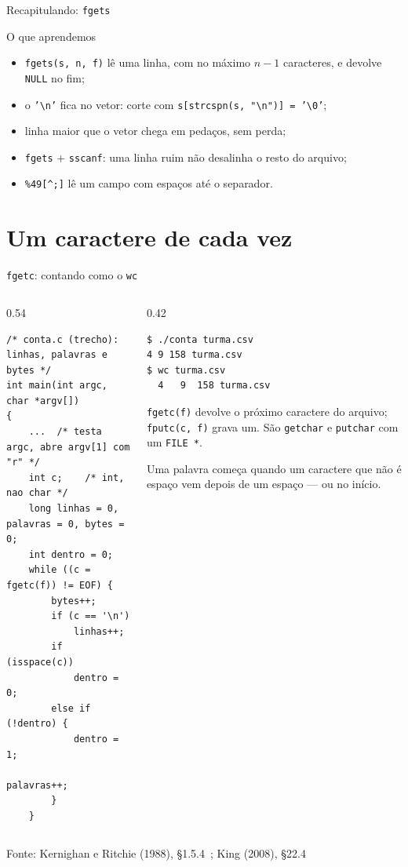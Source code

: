 \documentclass[aspectratio=169]{beamer}
\newcommand{\cir}{\textasciicircum}
\newcommand{\fonte}[1]{\vfill\hfill{\scriptsize\textcolor{UFSGray}{Fonte: #1}}}
\begin{document}
\begin{frame}{Recapitulando: \texttt{fgets}}
  \begin{block}{O que aprendemos}
    \begin{itemize}
      \item \texttt{fgets(s, n, f)} lê uma linha, com no máximo $n-1$
        caracteres, e devolve \texttt{NULL} no fim;
      \item o \texttt{'\textbackslash n'} fica no vetor: corte com
        \texttt{s[strcspn(s, "\textbackslash n")] = '\textbackslash 0'};
      \item linha maior que o vetor chega em pedaços, sem perda;
      \item \texttt{fgets} + \texttt{sscanf}: uma linha ruim não desalinha
        o resto do arquivo;
      \item \texttt{\%49[\cir;]} lê um campo com espaços até o separador.
    \end{itemize}
  \end{block}
\end{frame}

\section{Um caractere de cada vez}

\begin{frame}[fragile]{\texttt{fgetc}: contando como o \texttt{wc}}
  \vspace{-0.5em}
  \begin{columns}[T]
    \begin{column}{0.54\textwidth}
\begin{lstlisting}[style=codCs]
/* conta.c (trecho): linhas, palavras e bytes */
int main(int argc, char *argv[])
{
    ...  /* testa argc, abre argv[1] com "r" */
    int c;    /* int, nao char */
    long linhas = 0, palavras = 0, bytes = 0;
    int dentro = 0;
    while ((c = fgetc(f)) != EOF) {
        bytes++;
        if (c == '\n')
            linhas++;
        if (isspace(c))
            dentro = 0;
        else if (!dentro) {
            dentro = 1;
            palavras++;
        }
    }
\end{lstlisting}
    \end{column}
    \begin{column}{0.42\textwidth}
\begin{lstlisting}[style=shellS]
$ ./conta turma.csv
4 9 158 turma.csv
$ wc turma.csv
  4   9  158 turma.csv
\end{lstlisting}
      \small \texttt{fgetc(f)} devolve o próximo caractere do arquivo;
      \texttt{fputc(c, f)} grava um. São \texttt{getchar} e
      \texttt{putchar} com um \texttt{FILE *}.

      \medskip
      Uma palavra começa quando um caractere que não é espaço vem depois de
      um espaço --- ou no início.
    \end{column}
  \end{columns}
  \fonte{Kernighan e Ritchie (1988), §1.5.4~\cite{kernighan1988c};
    King (2008), §22.4~\cite{king2008c}}
\end{frame}
\end{document}
